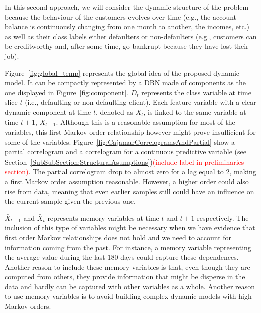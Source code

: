 In this second approach, we will consider the dynamic structure of the problem because the behaviour of the customers evolves over time (e.g., the account balance is continuously changing from one month to another, the incomes, etc.) as well as their class labels either defaulters or non-defaulters (e.g., customers can be creditworthy and, after some time, go bankrupt because they have lost their job). 

Figure~\ref{fig:global_temp} represents the global idea of the proposed dynamic model. It can be compactly represented by a DBN made of components as the one displayed in 
Figure~\ref{fig:component}. $D_t$ represents the class variable at time slice $t$ (i.e., defaulting or non-defaulting client). Each feature variable with a clear dynamic component at time $t$, denoted as $X_t$, is linked to the same variable at time $t+1$, $X_{t+1}$. Although this is a reasonable assumption for most of the variables, this first Markov order relationship however might prove insufficient for some of the variables. Figure~\ref{fig:CajamarCorrelogramsAndPartial} show a partial correlogram and a correlogram for a continuous predictive variable (see Section~\ref{SubSubSection:StructuralAsumptions})\textcolor{red}{(include label in preliminaries section)}. The partial correlogram drop to almost zero for a lag equal to $2$, making a first Markov order assumption reasonable. However, a higher order could also rise from data, meaning that even earlier samples still could have an influence on the current sample given the previous one. 

$\bar{X}_{t-1}$ and $\bar{X}_{t}$ represents memory variables at time $t$ and $t+1$ respectively. The inclusion of this type of variables might be necessary when we have evidence that first order Markov relationships does not hold and we need to account for information coming from the past. For instance, a memory variable representing the average value during the last $180$ days could capture these dependences. Another reason to include these memory variables is that, even though they are computed from others, they provide information that might be disperse in the data and hardly can be captured with other variables as a whole. Another reason to use memory variables is to avoid building complex dynamic models with high Markov orders.

